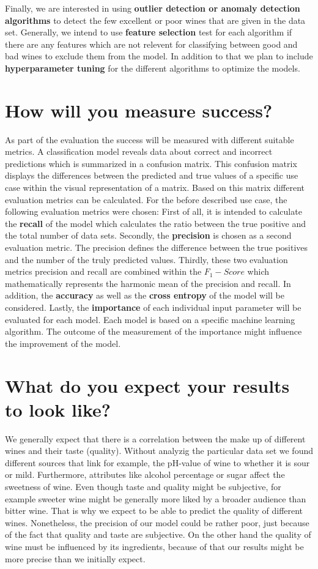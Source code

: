 \documentclass[11pt,titlepage,oneside,openany]{article}
\begin{document}
Finally, we are interested in using \textbf{outlier detection or anomaly detection algorithms} to detect the few 
excellent or poor wines that are given in the data set.
Generally, we intend to use \textbf{feature selection} test for each algorithm if there are any features which are not relevent 
for classifying between good and bad wines to exclude them from the model. In addition to that we plan to include
\textbf{hyperparameter tuning} for the different algorithms to optimize the models.

\section{How will you measure success?}
As part of the evaluation the success will be measured with different suitable metrics. A classification model reveals data about correct and incorrect predictions which is summarized in a confusion matrix. This confusion matrix displays the differences between the predicted and true values of a specific use case within the visual representation of a matrix. Based on this matrix different evaluation metrics can be calculated. For the before described use case, the following evaluation metrics were chosen:
First of all, it is intended to calculate the \textbf{recall} of the model which calculates the ratio between the true positive and the total number of data sets. Secondly, the \textbf{precision} is chosen as a second evaluation metric. The precision defines the difference between the true positives and the number of the truly predicted values. Thirdly, these two evaluation metrics precision and recall are combined within the \textbf{$F_1-Score$} which mathematically represents the harmonic mean of the precision and recall. In addition, the \textbf{accuracy} as well as the \textbf{cross entropy} of the model will be considered. Lastly, the \textbf{importance} of each individual input parameter will be evaluated for each model. Each model is based on a specific machine learning algorithm. The outcome of the measurement of the importance might influence the improvement of the model.


\section{What do you expect your results to look like?}
We generally expect that there is a correlation between the make up of different wines and their taste (quality). Without analyzig the particular data set we found different sources that link for example, the pH-value of wine to whether it is sour or mild. Furthermore, attributes like alcohol percentage or sugar affect the sweetness of wine. Even though taste and quality might be subjective, for example sweeter wine might be generally more liked by a broader audience than bitter wine. That is why we expect to be able to predict the quality of different wines. Nonetheless, the precision of our model could be rather poor, just because of the fact that quality and taste are subjective. On the other hand the quality of wine must be influenced by its ingredients, because of that our results might be more precise than we initially expect.
\end{document}
